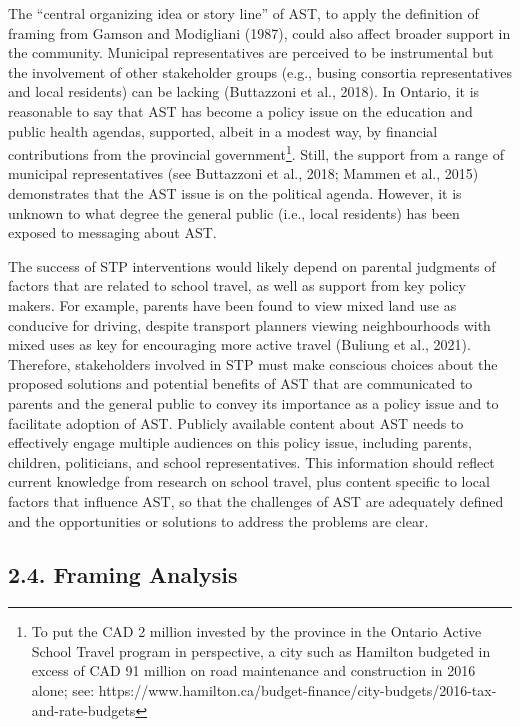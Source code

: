 \documentclass[]{elsarticle} %
\begin{document}
The ``central organizing idea or story line'' of AST, to apply the
definition of framing from Gamson and Modigliani (1987), could also
affect broader support in the community. Municipal representatives are
perceived to be instrumental but the involvement of other stakeholder
groups (e.g., busing consortia representatives and local residents) can
be lacking (Buttazzoni et al., 2018). In Ontario, it is reasonable to
say that AST has become a policy issue on the education and public
health agendas, supported, albeit in a modest way, by financial
contributions from the provincial government\footnote{To put the CAD 2
  million invested by the province in the Ontario Active School Travel
  program in perspective, a city such as Hamilton budgeted in excess of
  CAD 91 million on road maintenance and construction in 2016 alone;
  see:
  https://www.hamilton.ca/budget-finance/city-budgets/2016-tax-and-rate-budgets}.
Still, the support from a range of municipal representatives (see
Buttazzoni et al., 2018; Mammen et al., 2015) demonstrates that the AST
issue is on the political agenda. However, it is unknown to what degree
the general public (i.e., local residents) has been exposed to messaging
about AST.

The success of STP interventions would likely depend on parental
judgments of factors that are related to school travel, as well as
support from key policy makers. For example, parents have been found to
view mixed land use as conducive for driving, despite transport planners
viewing neighbourhoods with mixed uses as key for encouraging more
active travel (Buliung et al., 2021). Therefore, stakeholders involved
in STP must make conscious choices about the proposed solutions and
potential benefits of AST that are communicated to parents and the
general public to convey its importance as a policy issue and to
facilitate adoption of AST. Publicly available content about AST needs
to effectively engage multiple audiences on this policy issue, including
parents, children, politicians, and school representatives. This
information should reflect current knowledge from research on school
travel, plus content specific to local factors that influence AST, so
that the challenges of AST are adequately defined and the opportunities
or solutions to address the problems are clear.

\hypertarget{framing-analysis}{%
\subsection{2.4. Framing Analysis}\label{framing-analysis}}
\end{document}
